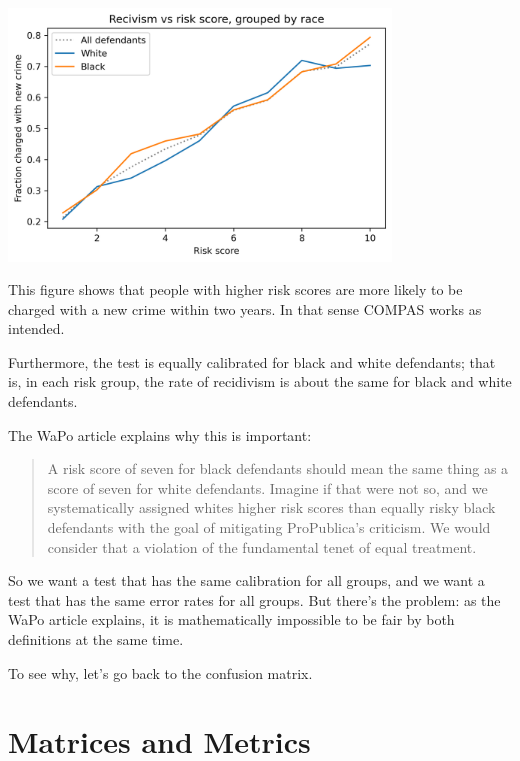 \begin{center}
\includegraphics[width=4in]{chapters/02_calibration_files/02_calibration_21_0.png}
\end{center}

This figure shows that people with higher risk scores are more likely to
be charged with a new crime within two years. In that sense COMPAS works
as intended.

Furthermore, the test is equally calibrated for black and white
defendants; that is, in each risk group, the rate of recidivism is about
the same for black and white defendants.

The WaPo article explains why this is important:

\begin{quote}
A risk score of seven for black defendants should mean the same thing as
a score of seven for white defendants. Imagine if that were not so, and
we systematically assigned whites higher risk scores than equally risky
black defendants with the goal of mitigating ProPublica's criticism. We
would consider that a violation of the fundamental tenet of equal
treatment.
\end{quote}

So we want a test that has the same calibration for all groups, and we
want a test that has the same error rates for all groups. But there's
the problem: as the WaPo article explains, it is mathematically
impossible to be fair by both definitions at the same time.

To see why, let's go back to the confusion matrix.

\hypertarget{matrices-and-metrics}{%
\section{Matrices and Metrics}\label{matrices-and-metrics}}

